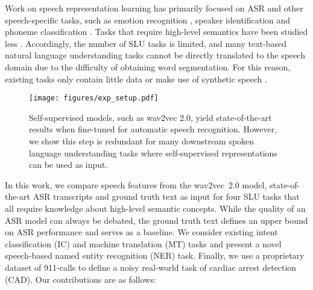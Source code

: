 \documentclass{article}
\begin{document}
Work on speech representation learning has primarily focused on ASR \cite{baevski2020wav2vec} and other speech-specific tasks, such as emotion recognition \cite{pascual2019learning}, speaker identification \cite{liu2020mockingjay} and phoneme classification \cite{baevski2021unsupervised}. Tasks that require high-level semantics have been studied less \cite{lai2021semi, yang2021superb}. Accordingly, the number of SLU tasks is limited, and many text-based natural language understanding tasks cannot be directly translated to the speech domain due to the difficulty of obtaining word segmentation. For this reason, existing tasks only contain little data \cite{lugosch2019speech} or make use of synthetic speech \cite{yang2021superb}.



\begin{figure}[!t]
  \centering
  \vspace{7mm}
  \texttt{[image: figures/exp\_setup.pdf]}
  \caption{Self-supervised models, such as wav2vec 2.0, yield state-of-the-art results when fine-tuned for automatic speech recognition. However, we show this step is redundant for many downstream spoken language understanding tasks where self-supervised representations can be used as input.}
  \label{fig:exp_setup}
  \vspace{5mm}
\end{figure}



In this work, we compare speech features from the wav2vec~2.0 model, state-of-the-art ASR transcripts and ground truth text as input for four SLU tasks that all require knowledge about high-level semantic concepts. While the quality of an ASR model can always be debated, the ground truth text defines an upper bound on ASR performance and serves as a baseline. We consider existing intent classification (IC) and machine translation (MT) tasks and present a novel speech-based named entity recognition (NER) task. Finally, we use a proprietary dataset of 911-calls to define a noisy real-world task of cardiac arrest detection (CAD). Our contributions are as follows:
\end{document}
